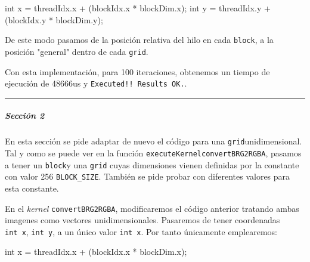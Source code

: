 \documentclass[
]{article}
\newenvironment{Shaded}{}{}
\newcommand{\DataTypeTok}[1]{\textcolor[rgb]{0.56,0.13,0.00}{#1}}
\newcommand{\NormalTok}[1]{#1}
\newcommand{\OperatorTok}[1]{\textcolor[rgb]{0.40,0.40,0.40}{#1}}
\begin{document}
\begin{Shaded}
\begin{Highlighting}[]
\DataTypeTok{int}\NormalTok{ x }\OperatorTok{=}\NormalTok{ threadIdx}\OperatorTok{.}\NormalTok{x }\OperatorTok{+} \OperatorTok{(}\NormalTok{blockIdx}\OperatorTok{.}\NormalTok{x }\OperatorTok{*}\NormalTok{ blockDim}\OperatorTok{.}\NormalTok{x}\OperatorTok{);} 
\DataTypeTok{int}\NormalTok{ y }\OperatorTok{=}\NormalTok{ threadIdx}\OperatorTok{.}\NormalTok{y }\OperatorTok{+} \OperatorTok{(}\NormalTok{blockIdx}\OperatorTok{.}\NormalTok{y }\OperatorTok{*}\NormalTok{ blockDim}\OperatorTok{.}\NormalTok{y}\OperatorTok{);} 
\end{Highlighting}
\end{Shaded}

De este modo pasamos de la posición relativa del hilo en cada
\texttt{block}, a la posición "general" dentro de cada \texttt{grid}.

Con esta implementación, para 100 iteraciones, obtenemos un tiempo de
ejecución de 48666us y \texttt{Executed!!\ Results\ OK.}.

\begin{center}\rule{0.5\linewidth}{0.5pt}\end{center}

\hypertarget{secciuxf3n-2}{%
\subparagraph{Sección 2}\label{secciuxf3n-2}}

En esta sección se pide adaptar de nuevo el código para una
\texttt{grid}unidimensional. Tal y como se puede ver en la función
\texttt{executeKernelconvertBRG2RGBA}, pasamos a tener un
\texttt{block}y una \texttt{grid} cuyas dimensiones vienen definidas por
la constante con valor 256 \texttt{BLOCK\_SIZE}. También se pide probar
con diferentes valores para esta constante.

En el \emph{kernel} \texttt{convertBRG2RGBA}, modificaremos el código
anterior tratando ambas imagenes como vectores unidimensionales.
Pasaremos de tener coordenadas \texttt{int\ x}, \texttt{int\ y}, a un
único valor \texttt{int\ x}. Por tanto únicamente emplearemos:

\begin{Shaded}
\begin{Highlighting}[]
\DataTypeTok{int}\NormalTok{ x }\OperatorTok{=}\NormalTok{ threadIdx}\OperatorTok{.}\NormalTok{x }\OperatorTok{+} \OperatorTok{(}\NormalTok{blockIdx}\OperatorTok{.}\NormalTok{x }\OperatorTok{*}\NormalTok{ blockDim}\OperatorTok{.}\NormalTok{x}\OperatorTok{);}
\end{Highlighting}
\end{Shaded}
\end{document}
